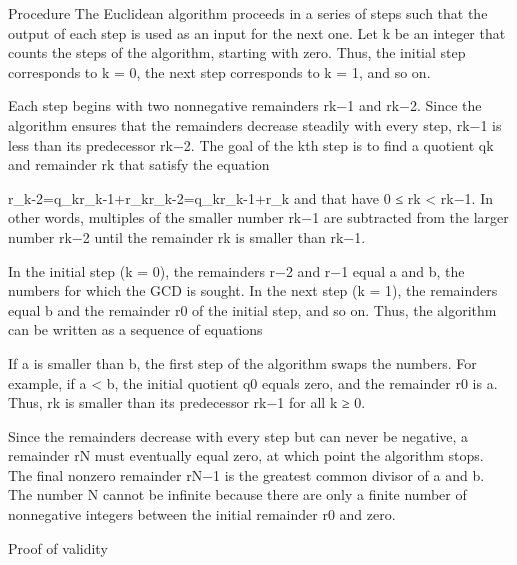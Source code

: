 Procedure
The Euclidean algorithm proceeds in a series of steps such that the output of each step is used as an input for the next one. Let k be an integer that counts the steps of the algorithm, starting with zero. Thus, the initial step corresponds to k = 0, the next step corresponds to k = 1, and so on.

Each step begins with two nonnegative remainders rk−1 and rk−2. Since the algorithm ensures that the remainders decrease steadily with every step, rk−1 is less than its predecessor rk−2. The goal of the kth step is to find a quotient qk and remainder rk that satisfy the equation

{\displaystyle r_{k-2}=q_{k}r_{k-1}+r_{k}}{\displaystyle r_{k-2}=q_{k}r_{k-1}+r_{k}}
and that have 0 ≤ rk < rk−1. In other words, multiples of the smaller number rk−1 are subtracted from the larger number rk−2 until the remainder rk is smaller than rk−1.

In the initial step (k = 0), the remainders r−2 and r−1 equal a and b, the numbers for which the GCD is sought. In the next step (k = 1), the remainders equal b and the remainder r0 of the initial step, and so on. Thus, the algorithm can be written as a sequence of equations

{}{}
If a is smaller than b, the first step of the algorithm swaps the numbers. For example, if a < b, the initial quotient q0 equals zero, and the remainder r0 is a. Thus, rk is smaller than its predecessor rk−1 for all k ≥ 0.

Since the remainders decrease with every step but can never be negative, a remainder rN must eventually equal zero, at which point the algorithm stops. The final nonzero remainder rN−1 is the greatest common divisor of a and b. The number N cannot be infinite because there are only a finite number of nonnegative integers between the initial remainder r0 and zero.

Proof of validity

